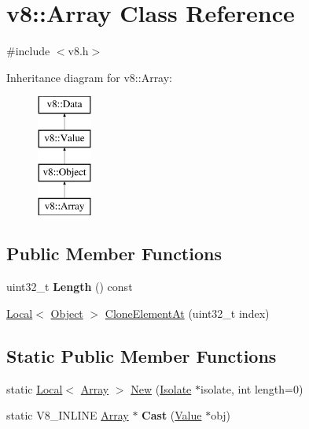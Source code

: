\hypertarget{classv8_1_1_array}{}\section{v8\+:\+:Array Class Reference}
\label{classv8_1_1_array}


{\ttfamily \#include $<$v8.\+h$>$}

Inheritance diagram for v8\+:\+:Array\+:\begin{figure}[H]
\begin{center}
\leavevmode
\includegraphics[height=4.000000cm]{classv8_1_1_array}
\end{center}
\end{figure}
\subsection*{Public Member Functions}
\begin{DoxyCompactItemize}
\item 
\hypertarget{classv8_1_1_array_a3c47dfd8d26e60ed4fcdc683034d6d9c}{}uint32\+\_\+t {\bfseries Length} () const \label{classv8_1_1_array_a3c47dfd8d26e60ed4fcdc683034d6d9c}

\item 
\hyperlink{classv8_1_1_local}{Local}$<$ \hyperlink{classv8_1_1_object}{Object} $>$ \hyperlink{classv8_1_1_array_a7335096a5349ce75b38d5b24af4bd125}{Clone\+Element\+At} (uint32\+\_\+t index)
\end{DoxyCompactItemize}
\subsection*{Static Public Member Functions}
\begin{DoxyCompactItemize}
\item 
static \hyperlink{classv8_1_1_local}{Local}$<$ \hyperlink{classv8_1_1_array}{Array} $>$ \hyperlink{classv8_1_1_array_a892f18fe6a25dfc0bc7b435759a30226}{New} (\hyperlink{classv8_1_1_isolate}{Isolate} $\ast$isolate, int length=0)
\item 
\hypertarget{classv8_1_1_array_ae56792766f8513395c3ebe8c29afde4b}{}static V8\+\_\+\+I\+N\+L\+I\+N\+E \hyperlink{classv8_1_1_array}{Array} $\ast$ {\bfseries Cast} (\hyperlink{classv8_1_1_value}{Value} $\ast$obj)\label{classv8_1_1_array_ae56792766f8513395c3ebe8c29afde4b}

\end{DoxyCompactItemize}


